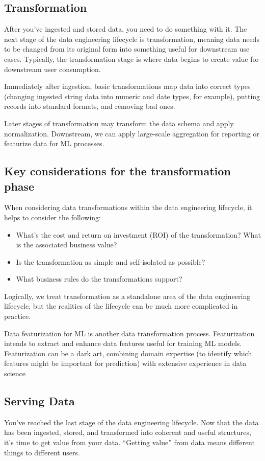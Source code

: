 \subsection{Transformation}
After you've ingested and stored data, you need to do something with it. The next
stage of the data engineering lifecycle is transformation, meaning data needs to be
changed from its original form into something useful for downstream use cases.
Typically, the transformation stage is where data begins to
create value for downstream user consumption.

Immediately after ingestion, basic transformations map data into correct types
(changing ingested string data into numeric and date types, for example), putting
records into standard formats, and removing bad ones.

Later stages of transformation
may transform the data schema and apply normalization. Downstream, we can apply
large-scale aggregation for reporting or featurize data for ML processes.

\subsection*{Key considerations for the transformation phase}
When considering data transformations within the data engineering lifecycle, it helps
to consider the following:
\begin{itemize}
    \item What's the cost and return on investment (ROI) of the transformation? What is
    the associated business value?
    \item Is the transformation as simple and self-isolated as possible?
    \item What business rules do the transformations support?
\end{itemize}

Logically, we treat transformation as a standalone area of the data engineering lifecycle,
but the realities of the lifecycle can be much more complicated in practice.

Data featurization for ML is another data transformation process. Featurization
intends to extract and enhance data features useful for training ML models. Featurization
can be a dark art, combining domain expertise (to identify which features
might be important for prediction) with extensive experience in data science




\subsection{Serving Data}
You've reached the last stage of the data engineering lifecycle. Now that the data has
been ingested, stored, and transformed into coherent and useful structures, it's time
to get value from your data. “Getting value” from data means different things to
different users.

